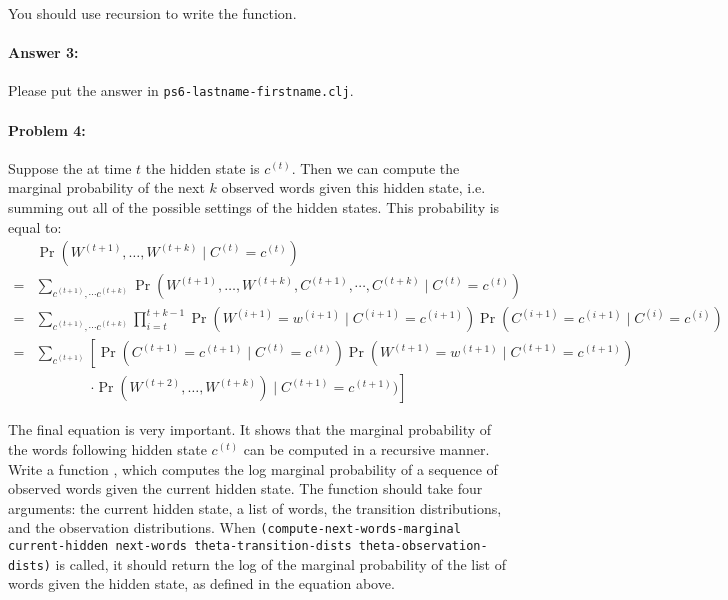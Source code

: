 \documentclass[10pt]{article}
\newcommand{\required}[1]{{\color{blue}{#1}}}
\newcommand{\PSnum}{6}
\begin{document}
You should use recursion to write the function. 

\paragraph{Answer 3:} Please put the answer in
\texttt{ps\PSnum-lastname-firstname.clj}.

\hrulefill%

\paragraph{Problem 4:}

Suppose the at time $t$ the hidden state is $c^{(t)}$. Then we can
compute the marginal probability of the next $k$ observed words
given this hidden state, i.e. summing out all of the possible settings
of the hidden states. This probability is equal to:
\begin{align*}
&\Pr(W^{(t+1)},\dots,W^{(t+k)} \mid C^{(t)}=c^{(t)} )\\ 
=& \sum_{c^{(t+1)},\cdots c^{(t+k)}} 
 \Pr(W^{(t+1)},\dots,W^{(t+k)},C^{(t+1)},\cdots,C^{(t+k)} \mid C^{(t)}=c^{(t)} ) \\
=& \sum_{c^{(t+1)},\cdots c^{(t+k)}} 
 \prod_{i=t}^{t+k-1} \Pr(W^{(i+1)}=w^{(i+1)} \mid C^{(i+1)}=c^{(i+1)}) \Pr(C^{(i+1)} =c^{(i+1)}\mid C^{(i)}=c^{(i)}) \\ 
= & \sum_{c^{(t+1)}}\left[ 
  \Pr(C^{(t+1)} =c^{(t+1)}\mid C^{(t)}=c^{(t)}) \Pr(W^{(t+1)} =w^{(t+1)}\mid C^{(t+1)}=c^{(t+1)})\right. \\
 &\phantom{\sum_{c^{(t+1)}}\ }\left.\cdot \Pr(W^{(t+2)},\dots,W^{(t+k)}) \mid C^{(t+1)}=c^{(t+1)} )\right]
\end{align*}

The final equation is very important. It shows that the marginal
probability of the words following hidden state $c^{(t)}$ can be
computed in a recursive manner. Write a function
\required{\texttt{compute-next-words-marginal}}, which computes the log marginal
probability of a sequence of observed words given the current hidden
state. The function should take four arguments: the current hidden
state, a list of words, the transition distributions, and the
observation distributions. When \texttt{(compute-next-words-marginal
  current-hidden next-words theta-transition-dists
  theta-observation-dists)} is called, it should return the log of the
marginal probability of the list of words given the hidden state, as
defined in the equation above.
\end{document}
